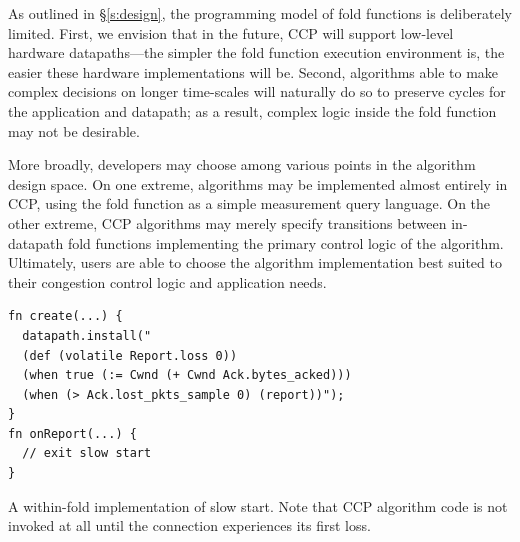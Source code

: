  As outlined in \S\ref{s:design}, the programming model of fold functions is deliberately limited.
First, we envision that in the future, CCP will support low-level hardware datapaths---the simpler the fold function execution environment is, the easier these hardware implementations will be. Second, algorithms able to make complex decisions on longer time-scales will naturally do so to preserve cycles for the application and datapath; as a result, complex logic inside the fold function may not be desirable.

More broadly, developers may choose among various points in the algorithm design space. 
On one extreme, algorithms may be implemented almost entirely in CCP, using the fold function as a simple measurement query language.
On the other extreme, CCP algorithms may merely specify transitions between in-datapath fold functions implementing the primary control logic of the algorithm.
Ultimately, users are able to choose the algorithm implementation best suited to their congestion control logic and application needs.

\begin{listing}[t]
{\footnotesize
\begin{verbatim}
fn create(...) {
  datapath.install("
  (def (volatile Report.loss 0))
  (when true (:= Cwnd (+ Cwnd Ack.bytes_acked)))
  (when (> Ack.lost_pkts_sample 0) (report))");
}
fn onReport(...) {
  // exit slow start
}
\end{verbatim}
}
\caption{A within-fold implementation of slow start. Note that CCP algorithm code is not invoked at all until the connection experiences its first loss.} \label{lst:ccp:ssfold}
\end{listing}
